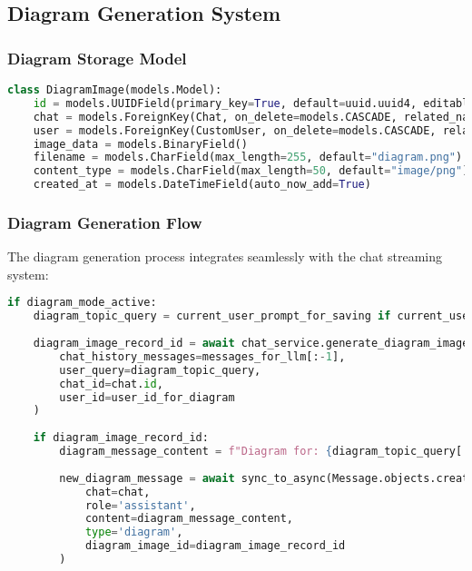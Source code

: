 \documentclass[12pt,a4paper]{article}
\begin{document}
\subsection{Diagram Generation System}

\subsubsection{Diagram Storage Model}

\begin{lstlisting}[language=Python, caption=Diagram Storage Implementation]
class DiagramImage(models.Model):
    id = models.UUIDField(primary_key=True, default=uuid.uuid4, editable=False)
    chat = models.ForeignKey(Chat, on_delete=models.CASCADE, related_name='diagram_images')
    user = models.ForeignKey(CustomUser, on_delete=models.CASCADE, related_name='diagram_images')
    image_data = models.BinaryField()
    filename = models.CharField(max_length=255, default="diagram.png")
    content_type = models.CharField(max_length=50, default="image/png")
    created_at = models.DateTimeField(auto_now_add=True)
\end{lstlisting}

\subsubsection{Diagram Generation Flow}

The diagram generation process integrates seamlessly with the chat streaming system:

\begin{lstlisting}[language=Python, caption=Diagram Generation in Stream]
if diagram_mode_active:
    diagram_topic_query = current_user_prompt_for_saving if current_user_prompt_for_saving else messages_for_llm[-1]['content']
    
    diagram_image_record_id = await chat_service.generate_diagram_image(
        chat_history_messages=messages_for_llm[:-1], 
        user_query=diagram_topic_query, 
        chat_id=chat.id,
        user_id=user_id_for_diagram
    )
    
    if diagram_image_record_id:
        diagram_message_content = f"Diagram for: {diagram_topic_query[:100]}"
        
        new_diagram_message = await sync_to_async(Message.objects.create)(
            chat=chat, 
            role='assistant', 
            content=diagram_message_content,
            type='diagram',
            diagram_image_id=diagram_image_record_id
        )
\end{lstlisting}
\end{document}
